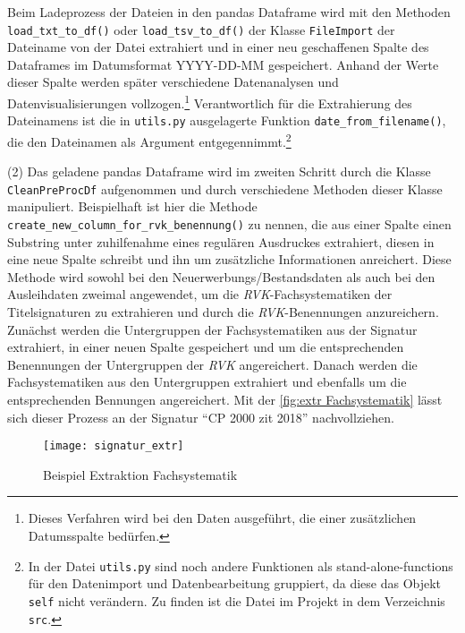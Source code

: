     Beim Ladeprozess der Dateien in den pandas Dataframe wird mit den Methoden \texttt{load\_txt\_to\_df()} oder \texttt{load\_tsv\_to\_df()} 
    der Klasse \texttt{FileImport} der Dateiname von der Datei extrahiert und in einer neu geschaffenen Spalte des Dataframes im Datumsformat YYYY-DD-MM gespeichert.
    Anhand der Werte dieser Spalte werden später verschiedene Datenanalysen und Datenvisualisierungen vollzogen.\footnote{Dieses Verfahren wird bei den Daten ausgeführt, die einer zusätzlichen Datumsspalte bedürfen.} 
    Verantwortlich für die Extrahierung des Dateinamens ist die in \texttt{utils.py} ausgelagerte Funktion \texttt{date\_from\_filename()},
    die den Dateinamen als Argument entgegennimmt.\footnote{In der Datei \texttt{utils.py} sind noch andere Funktionen als stand-alone-functions für den Datenimport und Datenbearbeitung gruppiert,
    da diese das Objekt \texttt{self} nicht verändern. Zu finden ist die Datei im Projekt in dem Verzeichnis \texttt{src}.} 
    
    (2) Das geladene pandas Dataframe wird im zweiten Schritt durch die Klasse \texttt{CleanPreProcDf} aufgenommen und durch verschiedene Methoden dieser Klasse
    manipuliert. Beispielhaft ist hier die Methode \texttt{create\_new\_column\_for\_rvk\_benennung()} zu nennen, die aus einer Spalte einen Substring unter
    zuhilfenahme eines regulären Ausdruckes extrahiert, diesen in eine neue Spalte schreibt und ihn um zusätzliche Informationen anreichert. 
    Diese Methode wird sowohl bei den Neuerwerbungs/Bestandsdaten als auch bei den Ausleihdaten zweimal angewendet, um die  \textit{\acrshort{RVK}}-Fachsystematiken der
    Titelsignaturen zu extrahieren und durch die \textit{\acrshort{RVK}}-Benennungen anzureichern. 
    Zunächst werden die Untergruppen der Fachsystematiken aus der Signatur extrahiert, in einer neuen Spalte gespeichert und um die entsprechenden Benennungen der Untergruppen der 
    \textit{\acrshort{RVK}} angereichert. 
    Danach werden die Fachsystematiken aus den Untergruppen extrahiert und ebenfalls um die entsprechenden Bennungen angereichert.
    Mit der \autoref{fig:extr Fachsystematik} lässt sich dieser Prozess an der Signatur \enquote{CP 2000 zit 2018} nachvollziehen.
    \begin{figure}[H]
        \centering
            \texttt{[image: signatur\_extr]}
            \caption{Beispiel Extraktion Fachsystematik}
            \label{fig:extr Fachsystematik}
    \end{figure}

